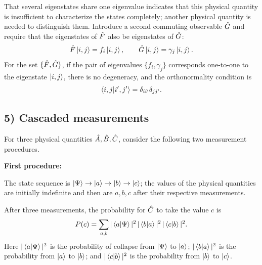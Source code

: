 That several eigenstates share one eigenvalue indicates that this physical quantity is insufficient to characterize the states completely; another physical quantity is needed to distinguish them. Introduce a second commuting observable $\hat{G}$ and require that the eigenstates of $\hat{F}$ also be eigenstates of $\hat{G}$:
\begin{equation}
\hat{F}\left|i,j\right\rangle=f_i\left|i,j\right\rangle,\qquad
  \hat{G}\left|i,j\right\rangle=\gamma_j\left|i,j\right\rangle.
\end{equation}
For the set $\{\hat{F},\hat{G}\}$, if the pair of eigenvalues $\{f_i,\gamma_j\}$ corresponds one-to-one to the eigenstate $\left|i,j\right\rangle$, there is no degeneracy, and the orthonormality condition is
\begin{equation}
\left\langle i,j\middle|i',j'\right\rangle=\delta_{ii'}\delta_{jj'}.
\end{equation}
\subsection*{5) Cascaded measurements}
For three physical quantities $\hat{A},\hat{B},\hat{C}$, consider the following two measurement procedures.

\textbf{First procedure:}
\begin{center}\end{center}
The state sequence is $\left|\Psi\right\rangle\rightarrow\left|a\right\rangle\rightarrow\left|b\right\rangle\rightarrow\left|c\right\rangle$; the values of the physical quantities are initially indefinite and then are $a,b,c$ after their respective measurements.

After three measurements, the probability for $\hat{C}$ to take the value $c$ is
\begin{equation}
P(c)=\sum_{a,b}|\left\langle a\middle|\Psi\right\rangle|^2\,|\left\langle b\middle|a\right\rangle|^2\,|\left\langle c\middle|b\right\rangle|^2.
\end{equation}
Here $|\left\langle a\middle|\Psi\right\rangle|^2$ is the probability of collapse from $\left|\Psi\right\rangle$ to $\left|a\right\rangle$; $|\left\langle b\middle|a\right\rangle|^2$ is the probability from $\left|a\right\rangle$ to $\left|b\right\rangle$; and $|\left\langle c\middle|b\right\rangle|^2$ is the probability from $\left|b\right\rangle$ to $\left|c\right\rangle$.

